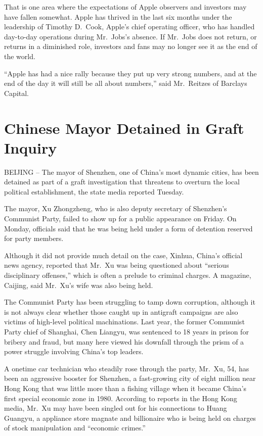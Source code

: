\documentclass[12pt,a4paper,onecolumn]{article}
\begin{document}
That is one area where the expectations of Apple observers and investors may have fallen somewhat.
Apple has thrived in the last six months under the leadership of Timothy D.~Cook, Apple's chief
operating officer, who has handled day-to-day operations during Mr.~Jobs's absence. If Mr.~Jobs does
not return, or returns in a diminished role, investors and fans may no longer see it as the end of
the world.

``Apple has had a nice rally because they put up very strong numbers, and at the end of the day it
will still be all about numbers,'' said Mr.~Reitzes of Barclays Capital.

\section{Chinese Mayor Detained in Graft Inquiry}

BEIJING -- The mayor of Shenzhen, one of China's most dynamic cities, has been detained as part of a
graft investigation that threatens to overturn the local political establishment, the state media
reported Tuesday.

The mayor, Xu Zhongzheng, who is also deputy secretary of Shenzhen's Communist Party, failed to show
up for a public appearance on Friday. On Monday, officials said that he was being held under a form
of detention reserved for party members.

Although it did not provide much detail on the case, Xinhua, China's official news agency, reported
that Mr.~Xu was being questioned about ``serious disciplinary offenses,'' which is often a prelude
to criminal charges. A magazine, Caijing, said Mr.~Xu's wife was also being held.

The Communist Party has been struggling to tamp down corruption, although it is not always clear
whether those caught up in antigraft campaigns are also victims of high-level political
machinations. Last year, the former Communist Party chief of Shanghai, Chen Liangyu, was sentenced
to 18 years in prison for bribery and fraud, but many here viewed his downfall through the prism of
a power struggle involving China's top leaders.

A onetime car technician who steadily rose through the party, Mr.~Xu, 54, has been an aggressive
booster for Shenzhen, a fast-growing city of eight million near Hong Kong that was little more than
a fishing village when it became China's first special economic zone in 1980. According to reports
in the Hong Kong media, Mr.~Xu may have been singled out for his connections to Huang Guangyu, a
appliance store magnate and billionaire who is being held on charges of stock manipulation and
``economic crimes.''
\end{document}
